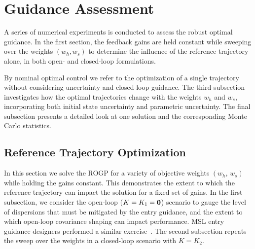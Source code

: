 \chapter{Guidance Assessment}\label{Ch:NumericalAssessment}
A series of numerical experiments is conducted to assess the robust optimal guidance. In the first section, the feedback gains are held constant while sweeping over the weights $(w_h,w_s)$ to determine the influence of the reference trajectory alone, in both open- and closed-loop formulations. 

By nominal optimal control we refer to the optimization of a single trajectory without considering uncertainty and closed-loop guidance. The third subsection investigates how the optimal trajectories change with the weights $w_h$ and $w_s$, incorporating both initial state uncertainty and parametric uncertainty. The final subsection presents a detailed look at one solution and the corresponding Monte Carlo statistics.

\section{Reference Trajectory Optimization}
In this section we solve the ROGP for a variety of objective weights $(w_h,\,w_s)$ while holding the gains constant. This demonstrates the extent to which the reference trajectory can impact the solution for a fixed set of gains. In the first subsection, we consider the open-loop ($K=K_1=\mathbf{0}$) scenario to gauge the level of dispersions that must be mitigated by the entry guidance, and the extent to which open-loop covariance shaping can impact performance. MSL entry guidance designers performed a similar exercise~\cite{MSL_EDL2}. The second subsection repeats the sweep over the weights in a closed-loop scenario with $K=K_2$.

